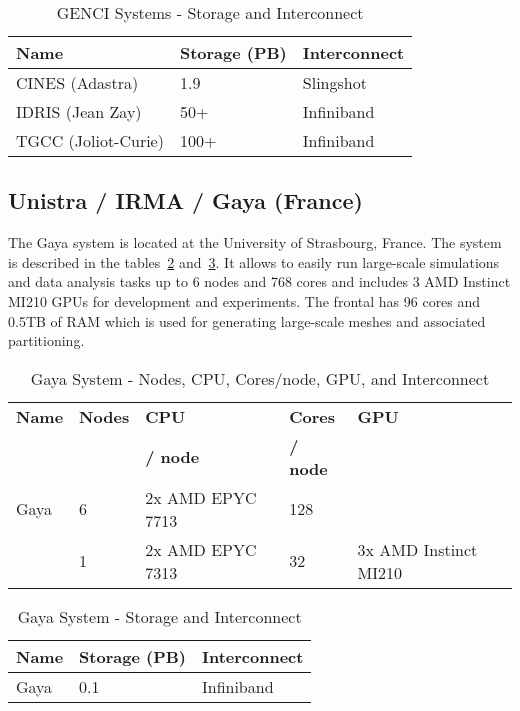     \begin{table}[h!]
        \centering
        \begin{tabular}{l l l}
        \toprule
        \textbf{Name} & \textbf{Storage (PB)} & \textbf{Interconnect} \\
        \midrule
        CINES (Adastra) & 1.9 & Slingshot \\
        IDRIS (Jean Zay) & 50+ & Infiniband \\
        TGCC (Joliot-Curie) & 100+ & Infiniband \\
        \bottomrule
        \end{tabular}
        \caption{GENCI Systems - Storage and Interconnect}
        \label{tab:genci_storage_interconnect}
    \end{table}

\subsection*{Unistra / IRMA / Gaya (France)}
\label{sec:arch:gaya}

The Gaya system is located at the University of Strasbourg, France. The system is described in the tables~\ref{tab:gaya_flops_cpu_gpu} and~\ref{tab:gaya_storage_interconnect}. It allows to easily run large-scale simulations and data analysis tasks up to 6 nodes and 768 cores and includes 3 AMD Instinct MI210 GPUs for development and experiments.
The frontal has 96 cores and 0.5TB of RAM which is used for generating large-scale meshes and associated partitioning.

\begin{table}[h!]
    \centering
    \begin{tabular}{l l l l l}
    \toprule
    \textbf{Name} & \textbf{Nodes} & \textbf{CPU} & \textbf{Cores} & \textbf{GPU} \\
    &  & \textbf{/ node}  & \textbf{/ node} &  \\
    \midrule
    Gaya &  6 & 2x AMD EPYC 7713 & 128 &  \\
         &  1 & 2x AMD EPYC 7313 & 32 & 3x AMD Instinct MI210 \\
    \bottomrule
    \end{tabular}
    \caption{Gaya System - Nodes, CPU, Cores/node, GPU, and Interconnect}
    \label{tab:gaya_flops_cpu_gpu}
\end{table}

    \begin{table}[h!]
        \centering
        \begin{tabular}{l l l}
        \toprule
        \textbf{Name} & \textbf{Storage (PB)} & \textbf{Interconnect} \\
        \midrule
        Gaya & 0.1 & Infiniband \\
        \bottomrule
    \end{tabular}
    \caption{Gaya System - Storage and Interconnect}
    \label{tab:gaya_storage_interconnect}
    \end{table}


